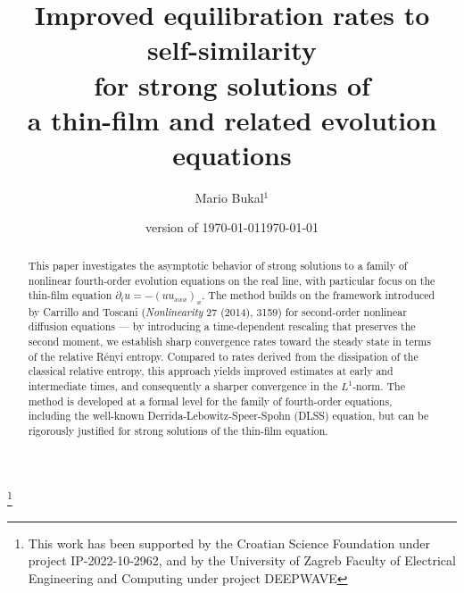 \documentclass[12pt]{amsart}
\date{version of \today}
\theoremstyle{plain}
\theoremstyle{definition}
\theoremstyle{remark}
\begin{document}
\title[Improved equilibration rates to self-similarity]{Improved equilibration rates to self-similarity\\ for strong solutions of\\ a thin-film and related evolution equations}
 
\author{Mario Bukal$^1$}
\address[1]{University of Zagreb,
Faculty of Electrical Engineering and Computing\newline
Unska 3, 10000 Zagreb, Croatia}

\thanks{This work has been supported by the Croatian Science
Foundation under project IP-2022-10-2962, and by the University of Zagreb Faculty of Electrical Engineering and Computing under project DEEPWAVE}



\begin{abstract}
This paper investigates the asymptotic behavior of strong solutions to a family of nonlinear fourth-order evolution equations on the real line, with particular focus on the thin-film equation $\partial_tu = -(uu_{xxx})_x$. The method builds on the framework introduced by Carrillo and Toscani ({\em Nonlinearity} 27 (2014), 3159) for second-order nonlinear diffusion equations --- by introducing a time-dependent rescaling that preserves the second moment, we establish sharp convergence rates toward the steady state in terms of the relative R\'enyi entropy. Compared to rates derived from the dissipation of the classical relative entropy, this approach yields improved estimates at early and intermediate times, and consequently a sharper convergence in the $L^1$-norm.
The method is developed at a formal level for the family of fourth-order equations, including the well-known Derrida-Lebowitz-Speer-Spohn (DLSS) equation, but can be rigorously justified for strong solutions of the thin-film equation.
\end{abstract} 

\date{\today}

\maketitle
\end{document}
